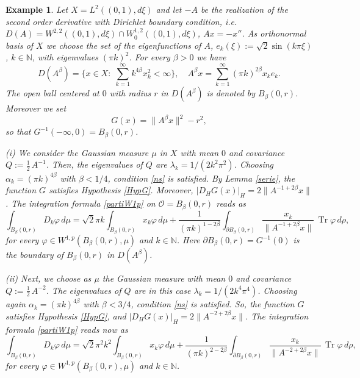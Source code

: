 \documentclass[reqno,twoside,12pt]{amsart}
\newtheorem{Example}[Theorem]{Example}
\begin{document}
\begin{Example}
{\em Let $X=L^2((0, 1), d\xi)$ and let $-A$ be the realization of the second order derivative with Dirichlet boundary condition, i.e. $D(A)=W^{2,2}((0, 1), d\xi) \cap W^{1,2}_0((0, 1), d\xi)$, $Ax = -x''$. As orthonormal basis of $X$ we choose the set of the eigenfunctions of $A$, $e_k(\xi) := \sqrt{2}\sin(k \pi \xi)$, $k\in {\mathbb N}$, with eigenvalues $(\pi k)^2$. For every $\beta >0$ we have 
$$D(A^{\beta}) = \{ x\in X:\; \sum_{k=1}^{\infty} k^{4\beta}x_k^2 <\infty\}, \quad A^{\beta}x =  \sum_{k=1}^{\infty} (\pi k)^{2\beta}x_ke_k. $$
The open ball  centered at $0$ with radius $r$ in $D(A^{\beta})$ is denoted by $B_{\beta}(0,r)$. Moreover we set
$$G(x) =  \|A^{\beta}x\|^2 - r^2,$$
so that $G^{-1}(-\infty, 0) = B_{\beta}(0,r)$. 

(i) We consider  the Gaussian measure $\mu $ in $X$ with mean $0$ and covariance $Q :=  \frac12\,A^{-1}$. Then, the eigenvalues of $Q$ are $\lambda_k = 1/(2k^2 \pi^2)$. 
Choosing $\alpha_k = (\pi k)^{4\beta}$ with $\beta < 1/4$, condition \eqref{ns} is satisfied. By Lemma \ref{serie},  the function $G$ satisfies Hypothesis \ref{HypG}. Moreover, $|D_HG(x)|_H = 2 \|A^{-1+2\beta}x\|$. The integration   formula \eqref{partiW1p} on ${\mathcal O} = B_{\beta}(0,r)$ reads as
$$\int_{B_{\beta}(0,r)} D_k\varphi \,d\mu =  \sqrt{2}\pi k \int_{B_{\beta}(0,r)} x_k\varphi \,d\mu 
+ \frac{1}{(\pi k)^{1-2\beta}} \int_{\partial B_{\beta}(0,r)} \frac{x_k}{\|A^{-1+2\beta}x\|}\,{\operatorname{Tr}} \varphi\, d\rho,   $$
for every  $\varphi\in W^{1,p}(B_{\beta}(0,r), \mu) $ and $k\in {\mathbb N}$. Here $\partial B_{\beta}(0,r) = G^{-1}(0)$ is the boundary of $B_{\beta}(0,r)$ in $D(A^{\beta})$. 
 
 
(ii) Next, we choose as $\mu$ the Gaussian measure with mean $0$ and covariance $Q :=  \frac12\,A^{-2}$. The eigenvalues of $Q$ are in this case $\lambda_k = 1/(2k^4 \pi^4)$. Choosing again $\alpha_k = (\pi k)^{4\beta}$ with $\beta < 3/4$, condition \eqref{ns} is satisfied. So,  the function $G $ satisfies Hypothesis \ref{HypG},  and $|D_HG(x)|_H = 2 \|A^{-2+2\beta}x\|$. The integration   formula \eqref{partiW1p} reads now as
$$\int_{B_{\beta}(0,r)} D_k\varphi \,d\mu =  \sqrt{2}\pi^2 k^2 \int_{B_{\beta}(0,r)} x_k\varphi \,d\mu 
+ \frac{1}{(\pi k)^{2-2\beta}} \int_{\partial B_{\beta}(0,r)} \frac{x_k}{\|A^{-2+2\beta}x\|}\,{\operatorname{Tr}} \varphi\, d\rho, $$
for every  $\varphi\in W^{1,p}(B_{\beta}(0,r), \mu) $ and $k\in {\mathbb N}$. }
\end{Example}
\end{document}

